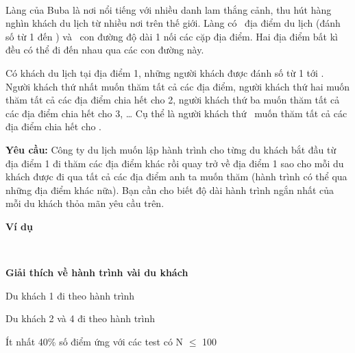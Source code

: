  

Làng của Buba là nơi nổi tiếng với nhiều danh lam thắng cảnh, thu hút hàng nghìn khách du lịch từ nhiều nơi trên thế giới. Làng có  địa điểm du lịch (đánh số từ 1 đến ) và  con đường độ dài 1 nối các cặp địa điểm. Hai địa điểm bất kì đều có thể đi đến nhau qua các con đường này.

Có khách du lịch tại địa điểm 1, những người khách được đánh số từ 1 tới . Người khách thứ nhất muốn thăm tất cả các địa điểm, người khách thứ hai muốn thăm tất cả các địa điểm chia hết cho 2, người khách thứ ba muốn thăm tất cả các địa điểm chia hết cho 3, … Cụ thể là người khách thứ  muốn thăm tất cả các địa điểm chia hết cho .

\textbf{Yêu cầu: } Công ty du lịch muốn lập hành trình cho từng du khách bắt đầu từ địa điểm 1 đi thăm các địa điểm khác rồi quay trở về địa điểm 1 sao cho mỗi du khách được đi qua tất cả các địa điểm anh ta muốn thăm (hành trình có thể qua những địa điểm khác nữa). Bạn cần cho biết độ dài hành trình ngắn nhất của mỗi du khách thỏa mãn yêu cầu trên.

\textbf{Ví dụ }

 

\textbf{Giải thích về hành trình vài du khách }

Du khách 1 đi theo hành trình \textbf{}

Du khách 2 và 4 đi theo hành trình

Ít nhất 40\% số điểm ứng với các test có N  $\le$  100